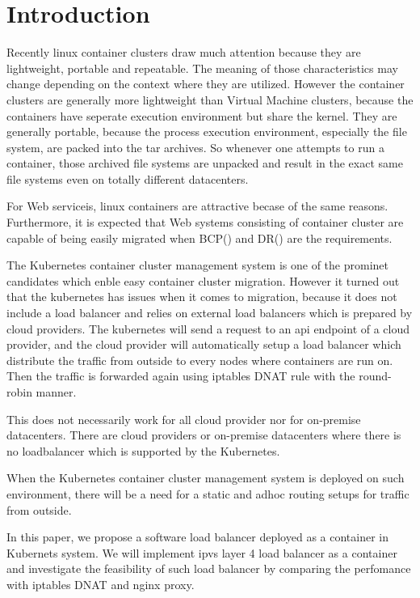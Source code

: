 \section{Introduction}

Recently linux container clusters draw much attention because they are lightweight, portable and repeatable.
The meaning of those characteristics may change depending on the context where they are utilized.
However the container clusters are generally more lightweight than Virtual Machine clusters, 
because the containers have seperate execution environment but share the kernel. 
They are generally portable, because the process execution environment, especially the file system, are packed
into the tar archives.
So whenever one attempts to run a container, those archived file systems
are unpacked and result in the exact same file systems even on totally different datacenters.

For Web serviceis, linux containers are attractive becase of the same reasons. 
Furthermore, it is expected that Web systems consisting of container cluster are capable of being easily migrated 
when BCP() and DR() are the requirements. 

The Kubernetes\cite{K8s2017} container cluster management system is one of the prominet candidates
which enble easy container cluster migration.
However it turned out that the kubernetes has issues when it comes to migration, 
because it does not include a load balancer and relies on external load balancers  
which is prepared by cloud providers.
The kubernetes will send a request to an api endpoint of a cloud provider, 
and the cloud provider will automatically setup a load balancer which distribute the traffic from outside to every nodes
 where containers are run on. Then the traffic is forwarded again using iptables DNAT rule with the round-robin manner. 

This does not necessarily work for all cloud provider nor for on-premise datacenters.
There are cloud providers or on-premise datacenters
where there is no loadbalancer which is supported by the Kubernetes.

When the Kubernetes container cluster management system is deployed on such environment,
there will be a need for a static and adhoc routing setups for traffic from outside.

In this paper, we propose a software load balancer deployed as a container in Kubernets system. 
We will implement ipvs layer 4 load balancer as a container and 
investigate the feasibility of such load balancer by comparing the perfomance with iptables DNAT and nginx proxy.

